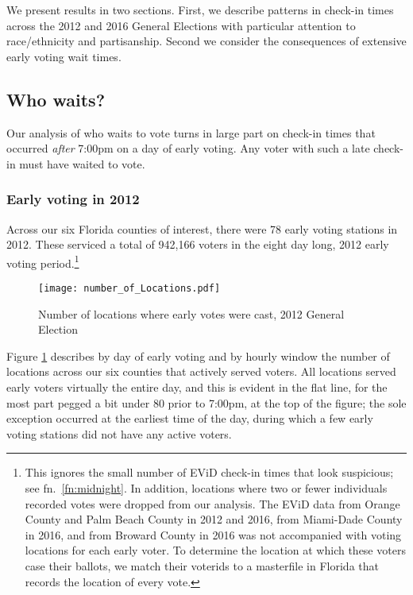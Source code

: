 \documentclass[12pt,titlepage]{article}
\begin{document}
We present results in two sections.  First, we describe patterns in
check-in times across the 2012 and 2016 General Elections with
particular attention to race/ethnicity and partisanship.  Second we
consider the consequences of extensive early voting wait times.


\subsection*{Who waits?}

Our analysis of who waits to vote turns in large part on check-in
times that occurred \emph{after} 7:00pm on a day of early voting.  Any
voter with such a late check-in must have waited to vote.

\subsubsection*{Early voting in 2012}

Across our six Florida counties of interest, there were 78 early
voting stations in 2012.  These serviced a total of 942,166 voters in
the eight day long, 2012 early voting period.\footnote{This ignores
  the small number of EViD check-in times that look suspicious; see
  fn.\ \ref{fn:midnight}.  In addition, locations where two or fewer
  individuals recorded votes were dropped from our analysis.  The EViD
  data from Orange County and Palm Beach County in 2012 and 2016, from
  Miami-Dade County in 2016, and from Broward County in 2016 was not
  accompanied with voting locations for each early voter.  To
  determine the location at which these voters case their ballots, we
  match their voterids to a masterfile in Florida that records the
  location of every vote.}  %



\begin{figure}[!ht]
  \caption{Number of locations where early votes were cast, 2012 General Election}
  \label{fig:nrlocs2012}
  \centering
    \centering\texttt{[image: number\_of\_Locations.pdf]}
\end{figure}

Figure \ref{fig:nrlocs2012} describes by day of early voting and by
hourly window the number of locations across our six counties that
actively served voters.  All locations served early voters virtually
the entire day, and this is evident in the flat line, for the most
part pegged a bit under 80 prior to 7:00pm, at the top of the figure;
the sole exception occurred at the earliest time of the day, during
which a few early voting stations did not have any active voters.
\end{document}
